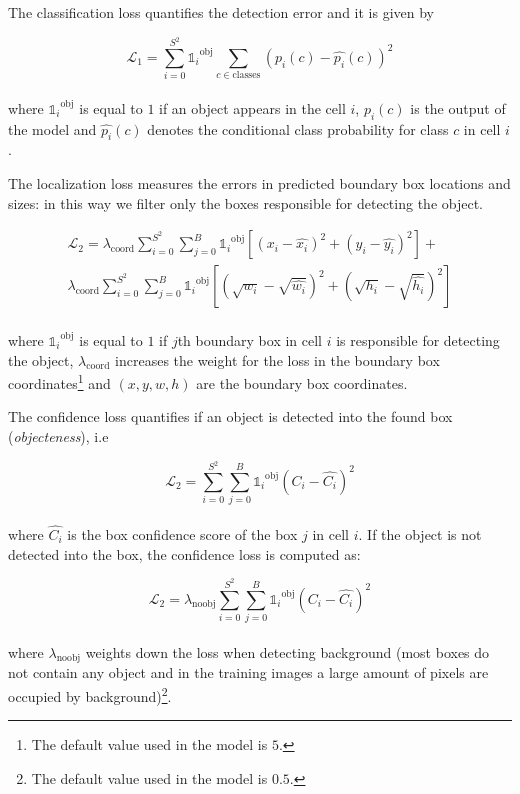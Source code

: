 \documentclass{standalone}
\begin{document}
The classification loss quantifies the detection error and it is given by

\begin{equation}
\mathcal{L}_1 = \sum_{i=0}^{S^2} {\mathds{1}_i}^{\mbox{obj}} \sum_{c \in \mbox{classes}} \left(p_i(c) - \hat{p_i}(c)\right)^2
\end{equation}
\\where ${\mathds{1}_i}^{\mbox{obj}}$ is equal to $1$ if an object appears in the cell $i$, $p_i(c)$ is the output of the model and $\hat{p_i}(c)$ denotes the conditional class probability for class $c$ in cell $i$.

The localization loss measures the errors in predicted boundary box locations and sizes: in this way we filter only the boxes responsible for detecting the object.

\begin{equation}
\begin{aligned}
\mathcal{L}_2 = \lambda_{\mbox{coord}} \sum_{i=0}^{S^2}\sum_{j=0}^B {\mathds{1}_i}^{\mbox{obj}} \left[ (x_i - \hat{x_i})^2 + (y_i - \hat{y_i})^2 \right] +
\\
\lambda_{\mbox{coord}} \sum_{i=0}^{S^2}\sum_{j=0}^B {\mathds{1}_i}^{\mbox{obj}} \left[ (\sqrt{w_i} - \sqrt{\hat{w_i}})^2 + (\sqrt{h_i} - \sqrt{\hat{h_i}})^2 \right]
\end{aligned}
\end{equation}
\\
where ${\mathds{1}_i}^{\mbox{obj}}$ is equal to $1$ if $j$th boundary box in cell $i$ is responsible for detecting the object, $\lambda_{\mbox{coord}}$ increases the weight for the loss in the boundary box coordinates\footnote{
  The default value used in the model is $5$.
} and $(x, y, w, h)$ are the boundary box coordinates.

The confidence loss quantifies if an object is detected into the found box (\emph{objecteness}), i.e

\begin{equation}
\mathcal{L}_2 = \sum_{i=0}^{S^2}\sum_{j=0}^B {\mathds{1}_i}^{\mbox{obj}} \left(C_i - \hat{C_i} \right)^2
\end{equation}
\\
where $\hat{C_i}$ is the box confidence score of the box $j$ in cell $i$.
If the object is not detected into the box, the confidence loss is computed as:

\begin{equation}
\mathcal{L}_2 = \lambda_{\mbox{noobj}}\sum_{i=0}^{S^2}\sum_{j=0}^B {\mathds{1}_i}^{\mbox{obj}} \left(C_i - \hat{C_i} \right)^2
\end{equation}
\\
where $\lambda_{\mbox{noobj}}$ weights down the loss when detecting background (most boxes do not contain any object and in the training images a large amount of pixels are occupied by background)\footnote{
  The default value used in the model is $0.5$.
}.
\end{document}
